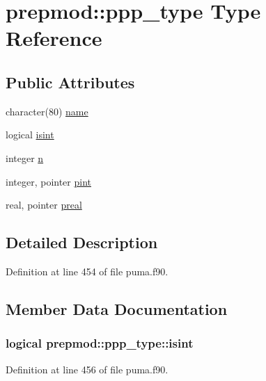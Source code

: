\hypertarget{structprepmod_1_1ppp__type}{
\section{prepmod\-:\-:ppp\-\_\-type \-Type \-Reference}
\label{structprepmod_1_1ppp__type}
}
\subsection*{\-Public \-Attributes}
\begin{DoxyCompactItemize}
\item 
character(80) \hyperlink{structprepmod_1_1ppp__type_ab9ad26f6cbb64570cc4171b5bb1ad15e}{name}
\item 
logical \hyperlink{structprepmod_1_1ppp__type_a50ade2f5ae307f4416d1c41fc74ea2f0}{isint}
\item 
integer \hyperlink{structprepmod_1_1ppp__type_ad89d33651c91bc5a6594a9522916f4c7}{n}
\item 
integer, pointer \hyperlink{structprepmod_1_1ppp__type_a4e5bc8c49dff8e4b1dff9722c55e3b43}{pint}
\item 
real, pointer \hyperlink{structprepmod_1_1ppp__type_a98966af6cabcf5a13a3ef4fab52de965}{preal}
\end{DoxyCompactItemize}


\subsection{\-Detailed \-Description}


\-Definition at line 454 of file puma.\-f90.



\subsection{\-Member \-Data \-Documentation}
\hypertarget{structprepmod_1_1ppp__type_a50ade2f5ae307f4416d1c41fc74ea2f0}{
\subsubsection[{isint}]{\setlength{\rightskip}{0pt plus 5cm}logical {\bf prepmod\-::ppp\-\_\-type\-::isint}}}
\label{structprepmod_1_1ppp__type_a50ade2f5ae307f4416d1c41fc74ea2f0}


\-Definition at line 456 of file puma.\-f90.

